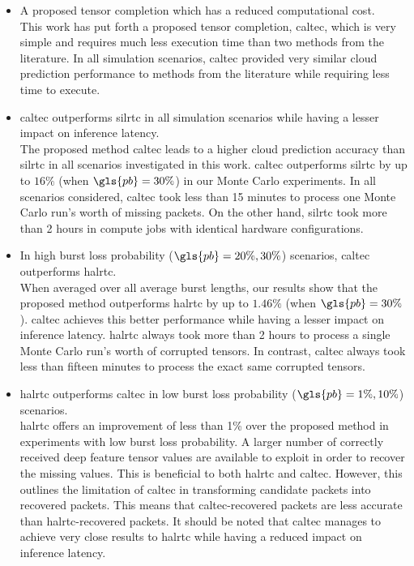 \begin{itemize}
	\item A proposed tensor completion which has a reduced computational cost.\\
	This work has put forth a proposed tensor completion, \gls{caltec}, which is very simple and requires much less execution time than two methods from the literature. In all simulation scenarios, \gls{caltec} provided very similar cloud prediction performance to methods from the literature while requiring less time to execute.
	\item \gls{caltec} outperforms \gls{silrtc} in all simulation scenarios while having a lesser impact on inference latency. \\
	The proposed method \gls{caltec} leads to a higher cloud prediction accuracy than \gls{silrtc} in all scenarios investigated in this work. \gls{caltec} outperforms \gls{silrtc} by up to $16\%$ (when $\gls{pb}=30\%$) in our Monte Carlo experiments. In all scenarios considered, \gls{caltec} took less than 15 minutes to process one Monte Carlo run's worth of missing packets. On the other hand, \gls{silrtc} took more than 2 hours in compute jobs with identical hardware configurations. 
	\item In high burst loss probability ($\gls{pb} = 20\%, 30\%$) scenarios, \gls{caltec} outperforms \gls{halrtc}. \\
	When averaged over all average burst lengths, our results show that the proposed method outperforms \gls{halrtc} by up to $1.46\%$ (when $\gls{pb}=30\%$). \gls{caltec} achieves this better performance while having a lesser impact on inference latency. \gls{halrtc} always took more than 2 hours to process a single Monte Carlo run's worth of corrupted tensors. In contrast, \gls{caltec} always took less than fifteen minutes to process the exact same corrupted tensors.
	\item \gls{halrtc} outperforms \gls{caltec} in low burst loss probability ($\gls{pb}=1\%,10\%$) scenarios. \\
	\gls{halrtc} offers an improvement of less than 1\% over the proposed method in experiments with low burst loss probability. A larger number of correctly received deep feature tensor values are available to exploit in order to recover the missing values. This is beneficial to both \gls{halrtc} and \gls{caltec}. However, this outlines the limitation of \gls{caltec} in transforming candidate packets into recovered packets. This means that \gls{caltec}-recovered packets are less accurate than \gls{halrtc}-recovered packets. It should be noted that \gls{caltec} manages to achieve very close results to \gls{halrtc} while having a reduced impact on inference latency.

\end{itemize}
